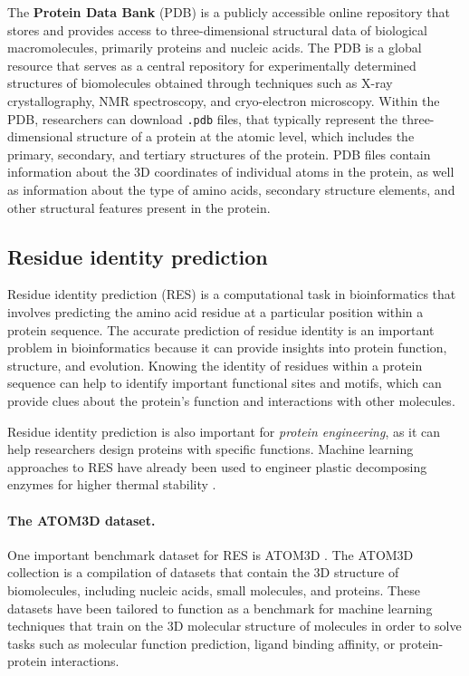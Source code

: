 The \textbf{Protein Data Bank} (PDB) is a publicly accessible online repository that stores and provides access to three-dimensional structural data of biological macromolecules, primarily proteins and nucleic acids. 
The PDB is a global resource that serves as a central repository for experimentally determined structures of biomolecules obtained through techniques such as X-ray crystallography, NMR spectroscopy, and cryo-electron microscopy.
Within the PDB, researchers can download \texttt{.pdb} files, that typically represent the three-dimensional structure of a protein at the atomic level, which includes the primary, secondary, and tertiary structures of the protein. 
PDB files contain information about the 3D coordinates of individual atoms in the protein, as well as information about the type of amino acids, secondary structure elements, and other structural features present in the protein.


\subsection{Residue identity prediction}
Residue identity prediction (RES) is a computational task in bioinformatics that involves predicting the amino acid residue at a particular position within a protein sequence. 
The accurate prediction of residue identity is an important problem in bioinformatics because it can provide insights into protein function, structure, and evolution. 
Knowing the identity of residues within a protein sequence can help to identify important functional sites and motifs, which can provide clues about the protein's function and interactions with other molecules. 

Residue identity prediction is also important for \textit{protein engineering}, as it can help researchers design proteins with specific functions.
Machine learning approaches to RES have already been used to engineer plastic decomposing enzymes for higher thermal stability \cite{Lu2022}.

\paragraph{The ATOM3D dataset.} One important benchmark dataset for RES is ATOM3D \cite{atom-3d}.
The ATOM3D collection is a compilation of datasets that contain the 3D structure of biomolecules, including nucleic acids, small molecules, and proteins. 
These datasets have been tailored to function as a benchmark for machine learning techniques that train on the 3D molecular structure of molecules in order to solve tasks such as molecular function prediction, ligand binding affinity, or protein-protein interactions.

